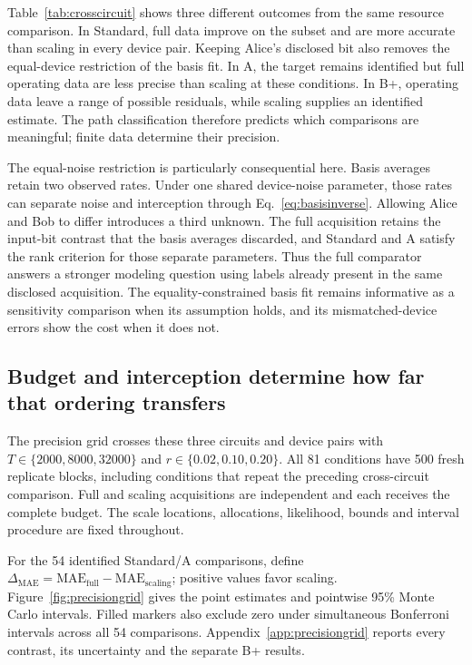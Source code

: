 \documentclass[manuscript,screen,review,anonymous]{acmart}
\begin{document}
Table~\ref{tab:crosscircuit} shows three different outcomes from the same
resource comparison. In Standard, full data improve on the subset and are
more accurate than scaling in every device pair. Keeping Alice's disclosed bit
also removes the equal-device restriction of the basis fit. In A, the target
remains identified but full operating data are less precise than scaling at
these conditions. In B+, operating data leave a range of possible residuals,
while scaling supplies an identified estimate. The path classification
therefore predicts which comparisons are meaningful; finite data determine
their precision.

The equal-noise restriction is particularly consequential here. Basis
averages retain two observed rates. Under one shared device-noise parameter,
those rates can separate noise and interception through Eq.~\eqref{eq:basisinverse}.
Allowing Alice and Bob to differ introduces a third unknown. The full
acquisition retains the input-bit contrast that the basis averages discarded,
and Standard and A satisfy the rank criterion for those separate parameters.
Thus the full comparator answers a stronger modeling question using labels
already present in the same disclosed acquisition. The equality-constrained
basis fit remains informative as a sensitivity comparison when its assumption
holds, and its mismatched-device errors show the cost when it does not.

\subsection{Budget and interception determine how far that ordering transfers}
\label{sec:precisiongrid}
The precision grid crosses these three circuits and device pairs with
$T\in\{2000,8000,32000\}$ and $r\in\{0.02,0.10,0.20\}$.
All 81 conditions have 500 fresh replicate blocks, including conditions
that repeat the preceding cross-circuit comparison. Full and scaling
acquisitions are independent and each receives the complete budget.
The scale locations, allocations, likelihood, bounds and interval procedure
are fixed throughout.

For the 54 identified Standard/A comparisons, define
$\Delta_{\mathrm{MAE}}=\mathrm{MAE}_{\mathrm{full}}-
\mathrm{MAE}_{\mathrm{scaling}}$; positive values favor scaling.
Figure~\ref{fig:precisiongrid} gives the point estimates and pointwise 95\%
Monte Carlo intervals. Filled markers also exclude zero under simultaneous
Bonferroni intervals across all 54 comparisons. Appendix~\ref{app:precisiongrid}
reports every contrast, its uncertainty and the separate B+ results.
\end{document}
